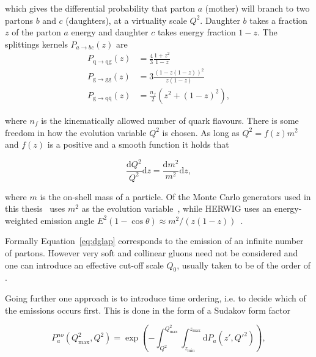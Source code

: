 \noindent which gives the differential probability that parton $a$ (mother) will branch to two partons $b$ and $c$ (daughters), at a virtuality scale $Q^2$. Daughter $b$ takes a fraction $z$ of the parton $a$ energy and daughter $c$ takes energy fraction $1-z$. The splittings kernels $P_{a\rightarrow bc}\left(z\right)$ are 
\nopagebreak
\begin{align}
P_\mathrm{q\rightarrow qg}\left(z\right) &= \frac{4}{3}\frac{1+z^2}{1-z} \\
P_\mathrm{g\rightarrow gg}\left(z\right) &= 3\frac{\left(1-z\left(1-z \right) \right)^2}{z\left(1-z\right)} \\
P_\mathrm{g\rightarrow q \bar q}\left(z\right)& = \frac{n_f}{2}\left( z^2+\left(1-z\right)^2\right),
\end{align}

\noindent where $n_f$ is the kinematically allowed number of quark flavours. There is some freedom in how the evolution variable $Q^2$ is chosen. As long as $Q^2=f\left(z \right) m^2$ and $f\left(z \right)$ is a positive and a smooth function it holds that

\begin{equation}
\frac{\mathrm{d}Q^2}{Q^2}\mathrm{d}z = \frac{\mathrm{d} m^2}{m^2} \mathrm{d}z, 
\end{equation}


\noindent where $m$ is the on-shell mass of a particle. Of the Monte Carlo generators used in this thesis \pythia~uses $m^2$ as the evolution variable~\cite{introPythia82}, while HERWIG uses an energy-weighted emission angle $E^2\left(1-\cos\theta\right) \approx m^2/\left(z\left(1-z\right)\right)$~\cite{herwigManual}.

Formally Equation~\ref{eq:dglap} corresponds to the emission of an infinite number of partons. However very soft and collinear gluons need not be considered and one can introduce an effective cut-off scale $Q_0$, usually taken to be of the order of \unit[1]{\gev}.

Going further one approach is to introduce time ordering, i.e. to decide which of the emissions occurs first. This is done in the form of a Sudakov form factor~\cite{eventGenerators}

\begin{equation}
P_a^{no}\left(Q^2_\mathrm{max},Q^2\right) = \exp \left(- \int_{Q^2}^{Q^2_\mathrm{max}}\int_{z_\mathrm{min}}^{z_\mathrm{max}} \mathrm{d} P_a \left(z',Q'^2\right)\right),
\end{equation} 

